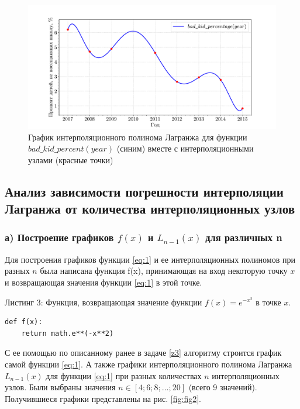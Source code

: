 \begin{figure}
    \centering
    \includegraphics[width=1\linewidth]{labs/kid_percentage_interpolation.pdf}
    \caption{График интерполяционного полинома Лагранжа для функции $bad\_kid\_percent(year)$ (синим) вместе с интерполяционными узлами (красные точки)}
    \label{fig:fig1}
\end{figure}
\pagebreak

\subsection{Анализ зависимости погрешности интерполяции Лагранжа от количества интерполяционных узлов}
\label{z4}

\subsubsection{а) Построение графиков $f(x)$ и $L_{n-1}(x)$ для различных n}
\label{z4a}

Для построения графиков функции \eqref{eq:1} и ее интерполяционных полиномов при разных $n$ была написана функция f(x), принимающая на вход некоторую точку $x$ и возвращающая значения функции \eqref{eq:1} в этой точке. 

Листинг 3: Функция, возвращающая значение функции $f(x) = e^{-x^2}$ в точке $x$.
\begin{lstlisting}[label={lst:listing3}]
def f(x):
    return math.e**(-x**2)
\end{lstlisting}
С ее помощью по описанному ранее в задаче \ref{z3} алгоритму строится график самой функции \eqref{eq:1}. А также графики интерполяционного полинома Лагранжа $L_{n-1}(x)$ для функции \eqref{eq:1} при разных количествах $n$ интерполяционных узлов. Были выбраны значения $n \in [4;6;8;...;20]$ (всего 9 значений). Получившиеся графики представлены на рис. \ref{fig:fig2}.

